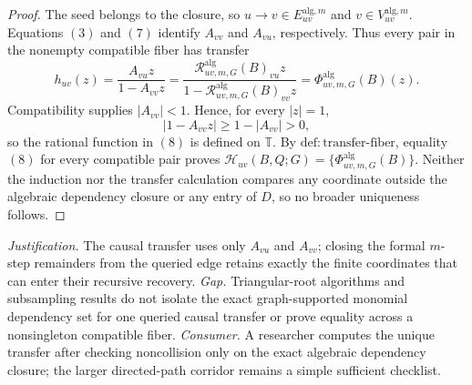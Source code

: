 \documentclass{article}
\begin{document}
\begin{proof}
The seed belongs to the closure, so \(u\to v\in E_{uv}^{\mathrm{alg},m}\) and \(v\in V_{uv}^{\mathrm{alg},m}\).  Equations \((3)\) and \((7)\) identify \(A_{vv}\) and \(A_{vu}\), respectively.  Thus every pair in the nonempty compatible fiber has transfer
\[
 h_{uv}(z)
 =\frac{A_{vu}z}{1-A_{vv}z}
 =\frac{\mathscr R^{\mathrm{alg}}_{uv,m,G}(B)_{vu}z}
 {1-\mathscr R^{\mathrm{alg}}_{uv,m,G}(B)_{vv}z}
 =\Phi^{\mathrm{alg}}_{uv,m,G}(B)(z).
\tag{8}
\]
Compatibility supplies \(|A_{vv}|<1\).  Hence, for every \(|z|=1\),
\[
 |1-A_{vv}z|\ge1-|A_{vv}|>0,
\tag{9}
\]
so the rational function in \((8)\) is defined on \(\mathbb T\).  By \(\mathrm{def{:}transfer\mbox{-}fiber}\), equality \((8)\) for every compatible pair proves
\(\mathcal H_{uv}(B,Q;G)=\{\Phi^{\mathrm{alg}}_{uv,m,G}(B)\}\).  Neither the induction nor the transfer calculation compares any coordinate outside the algebraic dependency closure or any entry of \(D\), so no broader uniqueness follows.
\end{proof}
\par\smallskip\noindent \textit{Justification.} The causal transfer uses only \(A_{vu}\) and \(A_{vv}\); closing the formal \(m\)-step remainders from the queried edge retains exactly the finite coordinates that can enter their recursive recovery. \textit{Gap.} Triangular-root algorithms and subsampling results do not isolate the exact graph-supported monomial dependency set for one queried causal transfer or prove equality across a nonsingleton compatible fiber. \textit{Consumer.} A researcher computes the unique transfer after checking noncollision only on the exact algebraic dependency closure; the larger directed-path corridor remains a simple sufficient checklist.
\end{document}
